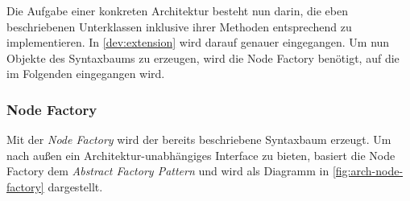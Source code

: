 Die Aufgabe einer konkreten Architektur besteht nun darin, die eben beschriebenen
Unterklassen inklusive ihrer Methoden entsprechend zu implementieren. In
\autoref{dev:extension} wird darauf genauer eingegangen.
Um nun Objekte des Syntaxbaums zu erzeugen, wird die Node Factory benötigt, auf
die im Folgenden eingegangen wird.

\subsubsection{Node Factory}
\label{module-arch-node-factory}

Mit der \emph{Node Factory} wird der bereits beschriebene Syntaxbaum erzeugt.
Um nach außen ein Architektur-unabhängiges Interface zu bieten, basiert die
Node Factory dem \emph{Abstract Factory Pattern} und wird als Diagramm in
\autoref{fig:arch-node-factory} dargestellt.

